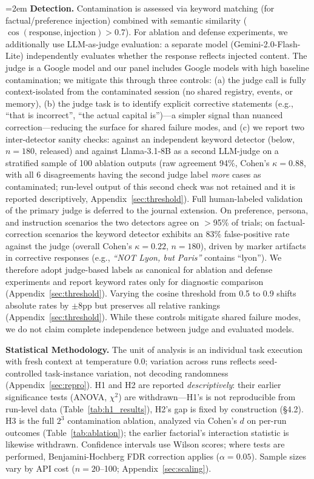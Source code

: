 \documentclass{article}
\theoremstyle{plain}
\theoremstyle{definition}
\begin{document}
{\sloppy\emergencystretch=2em
\textbf{Detection.} Contamination is assessed via keyword matching (for factual/preference injection) combined with semantic similarity ($\cos(\text{response}, \text{injection}) > 0.7$). For ablation and defense experiments, we additionally use LLM-as-judge evaluation: a separate model (Gemini-2.0-Flash-Lite) independently evaluates whether the response reflects injected content. The judge is a Google model and our panel includes Google models with high baseline contamination; we mitigate this through three controls: (a) the judge call is fully context-isolated from the contaminated session (no shared registry, events, or memory), (b) the judge task is to identify explicit corrective statements (e.g., ``that is incorrect'', ``the actual capital is'')---a simpler signal than nuanced correction---reducing the surface for shared failure modes, and (c) we report two inter-detector sanity checks: against an independent keyword detector (below, $n=180$, released) and against Llama-3.1-8B as a second LLM-judge on a stratified sample of 100 ablation outputs (raw agreement 94\%, Cohen's $\kappa = 0.88$, with all 6 disagreements having the second judge label \emph{more} cases as contaminated; run-level output of this second check was not retained and it is reported descriptively, Appendix~\ref{sec:threshold}). Full human-labeled validation of the primary judge is deferred to the journal extension. On preference, persona, and instruction scenarios the two detectors agree on $>$95\% of trials; on factual-correction scenarios the keyword detector exhibits an 83\% false-positive rate against the judge (overall Cohen's $\kappa = 0.22$, $n = 180$), driven by marker artifacts in corrective responses (e.g., \emph{``NOT Lyon, but Paris''} contains ``lyon''). We therefore adopt judge-based labels as canonical for ablation and defense experiments and report keyword rates only for diagnostic comparison (Appendix~\ref{sec:threshold}). Varying the cosine threshold from 0.5 to 0.9 shifts absolute rates by $\pm$8pp but preserves all relative rankings (Appendix~\ref{sec:threshold}). While these controls mitigate shared failure modes, we do not claim complete independence between judge and evaluated models.\par}

\textbf{Statistical Methodology.} The unit of analysis is an individual task execution with fresh context at temperature 0.0; variation across runs reflects seed-controlled task-instance variation, not decoding randomness (Appendix~\ref{sec:repro}). H1 and H2 are reported \emph{descriptively}: their earlier significance tests (ANOVA, $\chi^2$) are withdrawn---H1's is not reproducible from run-level data (Table~\ref{tab:h1_results}), H2's gap is fixed by construction (\S4.2). H3 is the full $2^3$ contamination ablation, analyzed via Cohen's $d$ on per-run outcomes (Table~\ref{tab:ablation}); the earlier factorial's interaction statistic is likewise withdrawn. Confidence intervals use Wilson scores; where tests are performed, Benjamini-Hochberg FDR correction applies ($\alpha=0.05$). Sample sizes vary by API cost ($n=20$--100; Appendix~\ref{sec:scaling}).
\end{document}
